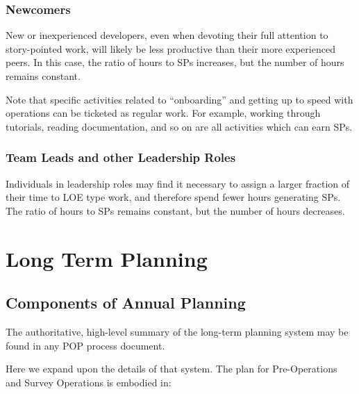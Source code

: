 \subsubsection{Newcomers}
\label{sec:newcomers}

New or inexperienced developers, even when devoting their full attention to \gls{story}-pointed work, will likely be less productive than their more experienced peers.
In this case, the ratio of hours to \glspl{SP} increases, but the number of hours remains constant.

Note that specific activities related to ``onboarding'' and getting up to speed with operations can be ticketed as regular work.
For example, working through tutorials, reading documentation, and so on are all activities which can earn \glspl{SP}.

\subsubsection{Team Leads and other Leadership Roles}

Individuals in leadership roles may find it necessary to assign a larger fraction of their time to \gls{LOE} type work, and therefore spend fewer hours generating \glspl{SP}.
The ratio of hours to \glspl{SP} remains constant, but the number of hours decreases.


\section{Long Term Planning}
\label{sec:long-term-plan}

\subsection{Components of Annual Planning}
\label{sec:annual-planning}
The authoritative, high-level summary of the long-term planning system may be found in any POP process document.

Here we expand upon the details of that system.
The plan for Pre-Operations and Survey Operations is embodied in:

